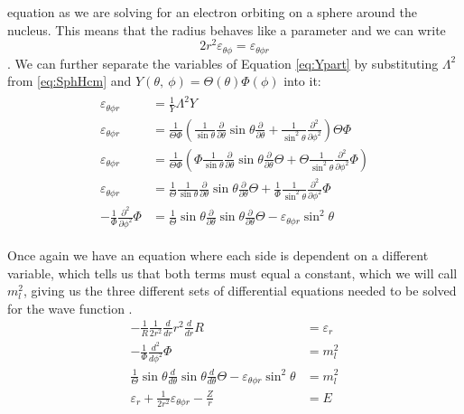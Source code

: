 \documentclass[../master_thesis.tex]{subfiles}
\begin{document}
equation as we are solving for an electron orbiting on a sphere around the nucleus.
This means that the radius behaves like a parameter and we can write
$$2r^2\varepsilon_{\theta\phi} = \varepsilon_{\theta\phi r}$$.
We can further separate the variables of Equation \ref{eq:Ypart} by substituting
$\Lambda^2$ from \ref{eq:SphHcm} and $Y(\theta, \ \phi) = \Theta(\theta)\Phi(\phi)$
into it:
\begin{align}
  \begin{split}
    \varepsilon_{\theta\phi r} &= \frac{1}{Y}\Lambda^2Y\\
    \varepsilon_{\theta\phi r} &= \frac{1}{\Theta\Phi}\left(\frac{1}{\sin{\theta}}\frac{\partial}{
                 \partial\theta}\sin{\theta}\frac{\partial}{\partial\theta}
                 + \frac{1}{\sin^2{\theta}}\frac{\partial^2}{\partial\phi^2}\right)
                 \Theta\Phi\\
    \varepsilon_{\theta\phi r} &= \frac{1}{\Theta\Phi}\left(\Phi\frac{1}{\sin{\theta}}\frac{\partial}{
                  \partial\theta}\sin{\theta}\frac{\partial}{\partial\theta}\Theta
                  + \Theta\frac{1}{\sin^2{\theta}}\frac{\partial^2}{\partial\phi^2}\Phi\right)\\
    \varepsilon_{\theta\phi r} &= \frac{1}{\Theta}\frac{1}{\sin{\theta}}\frac{\partial}{
                 \partial\theta}\sin{\theta}\frac{\partial}{\partial\theta}\Theta
                 + \frac{1}{\Phi}\frac{1}{\sin^2{\theta}}\frac{\partial^2}{\partial\phi^2}\Phi\\
    -\frac{1}{\Phi}\frac{\partial^2}{\partial\phi^2}\Phi &=  \frac{1}{\Theta}\sin{\theta}\frac{\partial}{
                 \partial\theta}\sin{\theta}\frac{\partial}{\partial\theta}\Theta - \varepsilon_{\theta\phi r}\sin^2{\theta}
  \end{split}
\end{align}

Once again we have an equation where each side is dependent on a different variable,
which tells us that both terms must equal a constant, which we will call $m_l^2$, giving us the
three different sets of differential equations needed to be solved for the
wave function \cite{Atkins:2014, Simons:2016, Atkins:2011}.
\begin{subequations}
  \begin{align}
    -\frac{1}{R}\frac{1}{2r^2}\frac{d}{d r}
    r^2\frac{d}{d r}R &= \varepsilon_r\label{eq:Radeq}\\
    -\frac{1}{\Phi}\frac{d^2}{d\phi^2}\Phi &= m_l^2\label{eq:phieq}\\
    \frac{1}{\Theta}\sin{\theta}\frac{d}{d\theta}\sin{\theta}
    \frac{d}{d\theta}\Theta -\varepsilon_{\theta\phi r}
    \sin^2{\theta} &= m_l^2 \label{eq:thetaeq}\\
    \varepsilon_r + \frac{1}{2r^2}\varepsilon_{\theta\phi r} - \frac{Z}{r} &= E
  \end{align}
\end{subequations}
\end{document}
